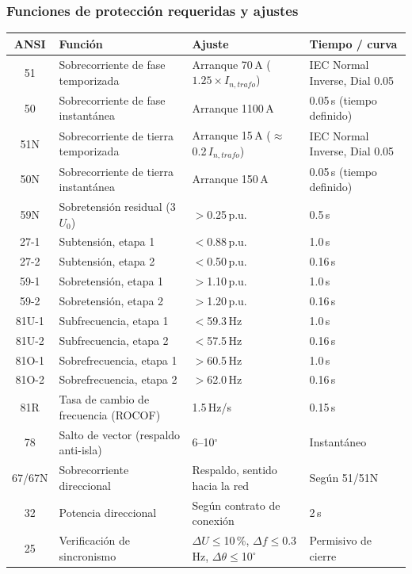 \documentclass[11pt,a4paper]{article}
\begin{document}
\subsubsection{Funciones de protecci\'on requeridas y ajustes}

\begin{center}
\begin{tabular}{|c|l|l|l|}
\hline
\textbf{ANSI} & \textbf{Funci\'on} & \textbf{Ajuste} & \textbf{Tiempo / curva} \\ \hline
51 & Sobrecorriente de fase temporizada & Arranque 70\,A ($1.25\times I_{n,trafo}$) & IEC Normal Inverse, Dial 0.05 \\ \hline
50 & Sobrecorriente de fase instant\'anea & Arranque 1100\,A & 0.05\,s (tiempo definido) \\ \hline
51N & Sobrecorriente de tierra temporizada & Arranque 15\,A ($\approx$0.2\,$I_{n,trafo}$) & IEC Normal Inverse, Dial 0.05 \\ \hline
50N & Sobrecorriente de tierra instant\'anea & Arranque 150\,A & 0.05\,s (tiempo definido) \\ \hline
59N & Sobretensi\'on residual (3$U_0$) & $>$0.25\,p.u. & 0.5\,s \\ \hline
27-1 & Subtensi\'on, etapa 1 & $<$0.88\,p.u. & 1.0\,s \\ \hline
27-2 & Subtensi\'on, etapa 2 & $<$0.50\,p.u. & 0.16\,s \\ \hline
59-1 & Sobretensi\'on, etapa 1 & $>$1.10\,p.u. & 1.0\,s \\ \hline
59-2 & Sobretensi\'on, etapa 2 & $>$1.20\,p.u. & 0.16\,s \\ \hline
81U-1 & Subfrecuencia, etapa 1 & $<$59.3\,Hz & 1.0\,s \\ \hline
81U-2 & Subfrecuencia, etapa 2 & $<$57.5\,Hz & 0.16\,s \\ \hline
81O-1 & Sobrefrecuencia, etapa 1 & $>$60.5\,Hz & 1.0\,s \\ \hline
81O-2 & Sobrefrecuencia, etapa 2 & $>$62.0\,Hz & 0.16\,s \\ \hline
81R & Tasa de cambio de frecuencia (ROCOF) & 1.5\,Hz/s & 0.15\,s \\ \hline
78 & Salto de vector (respaldo anti-isla) & 6--10$^\circ$ & Instant\'aneo \\ \hline
67/67N & Sobrecorriente direccional & Respaldo, sentido hacia la red & Seg\'un 51/51N \\ \hline
32 & Potencia direccional & Seg\'un contrato de conexi\'on & 2\,s \\ \hline
25 & Verificaci\'on de sincronismo & $\Delta U\le$10\,\%, $\Delta f\le$0.3\,Hz, $\Delta\theta\le$10$^\circ$ & Permisivo de cierre \\ \hline
\end{tabular}
\end{center}
\end{document}
